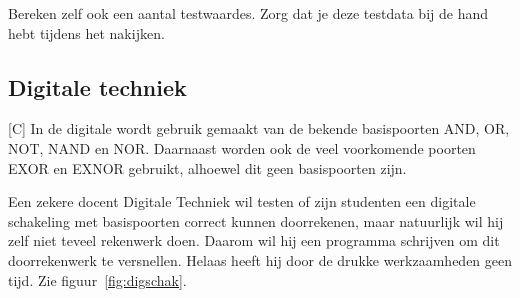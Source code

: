 \documentclass[a4paper,10pt,fleqn,twoside]{article}
\begin{document}
Bereken zelf ook een aantal testwaardes. Zorg dat je deze testdata bij de hand hebt tijdens het nakijken.

\subsection{Digitale techniek}[C]
In de digitale wordt gebruik gemaakt van de bekende basispoorten AND, OR, NOT, NAND en NOR. Daarnaast worden ook de veel voorkomende poorten EXOR en EXNOR gebruikt, alhoewel dit geen basispoorten zijn.

Een zekere docent Digitale Techniek wil testen of zijn studenten een digitale schakeling met basispoorten correct kunnen doorrekenen, maar natuurlijk wil hij zelf niet teveel rekenwerk doen. Daarom wil hij een programma schrijven om dit doorrekenwerk te versnellen. Helaas heeft hij door de drukke werkzaamheden geen tijd. 
Zie figuur~\ref{fig:digschak}.
\end{document}
